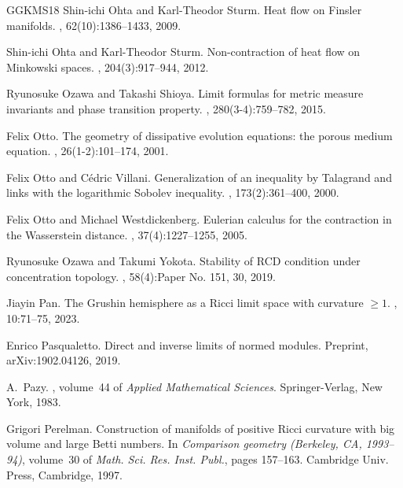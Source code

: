 \documentclass[11pt]{article}
\numberwithin{equation}{section}
\begin{document}
{\begin{thebibliography}{GGKMS18}
Shin-ichi Ohta and Karl-Theodor Sturm.
\newblock Heat flow on {F}insler manifolds.
, 62(10):1386--1433, 2009.

Shin-ichi Ohta and Karl-Theodor Sturm.
\newblock Non-contraction of heat flow on {M}inkowski spaces.
, 204(3):917--944, 2012.

Ryunosuke Ozawa and Takashi Shioya.
\newblock Limit formulas for metric measure invariants and phase transition
  property.
, 280(3-4):759--782, 2015.

Felix Otto.
\newblock The geometry of dissipative evolution equations: the porous medium
  equation.
, 26(1-2):101--174, 2001.

Felix Otto and C{\'e}dric Villani.
\newblock Generalization of an inequality by {T}alagrand and links with the
  logarithmic {S}obolev inequality.
, 173(2):361--400, 2000.

Felix Otto and Michael Westdickenberg.
\newblock Eulerian calculus for the contraction in the {W}asserstein distance.
, 37(4):1227--1255, 2005.

Ryunosuke Ozawa and Takumi Yokota.
\newblock Stability of {RCD} condition under concentration topology.
, 58(4):Paper No. 151,
  30, 2019.

Jiayin Pan.
\newblock The {G}rushin hemisphere as a {R}icci limit space with curvature
  {$\ge1$}.
, 10:71--75, 2023.

Enrico Pasqualetto.
\newblock Direct and inverse limits of normed modules.
\newblock Preprint, arXiv:1902.04126, 2019.

A.~Pazy.
, volume~44 of {\em Applied Mathematical Sciences}.
\newblock Springer-Verlag, New York, 1983.

Grigori Perelman.
\newblock Construction of manifolds of positive {R}icci curvature with big
  volume and large {B}etti numbers.
\newblock In {\em Comparison geometry ({B}erkeley, {CA}, 1993--94)}, volume~30
  of {\em Math. Sci. Res. Inst. Publ.}, pages 157--163. Cambridge Univ. Press,
  Cambridge, 1997.


\end{thebibliography}}
\end{document}
